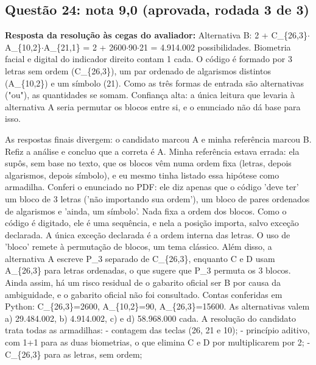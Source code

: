 \documentclass{article}%
\begin{document}
\subsection*{Questão 24: nota 9,0 (aprovada, rodada 3 de 3)}%
\textbf{Resposta da resolução às cegas do avaliador:} Alternativa B: 2 + C\_\{26,3\}$\cdot$A\_\{10,2\}$\cdot$A\_\{21,1\} = 2 + 2600$\cdot$90$\cdot$21 = 4.914.002 possibilidades. Biometria facial e digital do indicador direito contam 1 cada. O código é formado por 3 letras sem ordem (C\_\{26,3\}), um par ordenado de algarismos distintos (A\_\{10,2\}) e um símbolo (21). Como as três formas de entrada são alternativas ("ou"), as quantidades se somam. Confiança alta: a única leitura que levaria à alternativa A seria permutar os blocos entre si, e o enunciado não dá base para isso.\par %
As respostas finais divergem: o candidato marcou A e minha referência marcou B. Refiz a análise e concluo que a correta é A. Minha referência estava errada: ela supôs, sem base no texto, que os blocos vêm numa ordem fixa (letras, depois algarismos, depois símbolo), e eu mesmo tinha listado essa hipótese como armadilha. Conferi o enunciado no PDF: ele diz apenas que o código 'deve ter' um bloco de 3 letras ('não importando sua ordem'), um bloco de pares ordenados de algarismos e 'ainda, um símbolo'. Nada fixa a ordem dos blocos. Como o código é digitado, ele é uma sequência, e nela a posição importa, salvo exceção declarada. A única exceção declarada é a ordem interna das letras. O uso de 'bloco' remete à permutação de blocos, um tema clássico. Além disso, a alternativa A escreve P\_3 separado de C\_\{26,3\}, enquanto C e D usam A\_\{26,3\} para letras ordenadas, o que sugere que P\_3 permuta os 3 blocos. Ainda assim, há um risco residual de o gabarito oficial ser B por causa da ambiguidade, e o gabarito oficial não foi consultado.\newline%
\newline%
Contas conferidas em Python: C\_\{26,3\}=2600, A\_\{10,2\}=90, A\_\{26,3\}=15600. As alternativas valem a) 29.484.002, b) 4.914.002, c) e d) 58.968.000 cada.\newline%
\newline%
A resolução do candidato trata todas as armadilhas:\newline%
{-} contagem das teclas (26, 21 e 10);\newline%
{-} princípio aditivo, com 1+1 para as duas biometrias, o que elimina C e D por multiplicarem por 2;\newline%
{-} C\_\{26,3\} para as letras, sem ordem;\newline%
\end{document}

